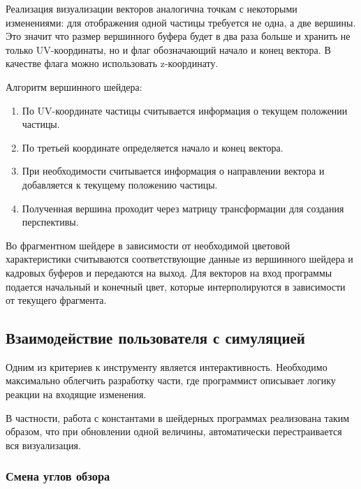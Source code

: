 Реализация визуализации векторов аналогична точкам с некоторыми изменениями: для отображения
одной частицы требуется не одна, а две вершины. Это значит что размер вершинного буфера
будет в два раза больше и хранить не только UV-координаты, но и флаг обозначающий начало
и конец вектора. В качестве флага можно использовать z-координату.

Алгоритм вершинного шейдера:

\begin{enumerate}
  \item По UV-координате частицы считывается информация о текущем положении частицы.
  \item По третьей координате определяется начало и конец вектора.
  \item При необходимости считывается информация о направлении вектора и добавляется к
    текущему положению частицы.
  \item Полученная вершина проходит через матрицу трансформации для создания перспективы.
\end{enumerate}

Во фрагментном шейдере в зависимости от необходимой цветовой характеристики считываются
соответствующие данные из вершинного шейдера и кадровых буферов и передаются на выход.
Для векторов на вход программы подается начальный и конечный цвет, которые
интерполируются в зависимости от текущего фрагмента.


\subsection{Взаимодействие пользователя с симуляцией}

Одним из критериев к инструменту является интерактивность.
Необходимо максимально облегчить разработку части, где программист описывает логику 
реакции на входящие изменения.

В частности, работа с константами в шейдерных программах реализована
таким образом, что при обновлении одной величины, автоматически перестраивается
вся визуализация.

\subsubsection{Смена углов обзора}

